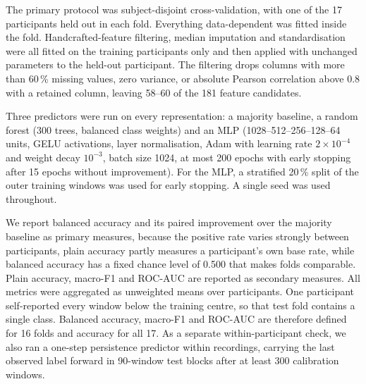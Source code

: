 The primary protocol was subject-disjoint cross-validation, with one of the 17 participants held out in each fold.
Everything data-dependent was fitted inside the fold.
Handcrafted-feature filtering, median imputation and standardisation were all fitted on the training participants only and then applied with unchanged parameters to the held-out participant.
The filtering drops columns with more than 60\,\% missing values, zero variance, or absolute Pearson correlation above 0.8 with a retained column, leaving 58--60 of the 181 feature candidates.

Three predictors were run on every representation: a majority baseline, a random forest (300 trees, balanced class weights) and an MLP (1028--512--256--128--64 units, GELU activations, layer normalisation, Adam with learning rate $2\times10^{-4}$ and weight decay $10^{-3}$, batch size 1024, at most 200 epochs with early stopping after 15 epochs without improvement).
For the MLP, a stratified 20\,\% split of the outer training windows was used for early stopping.
A single seed was used throughout.

We report balanced accuracy and its paired improvement over the majority baseline as primary measures, because the positive rate varies strongly between participants, plain accuracy partly measures a participant's own base rate, while balanced accuracy has a fixed chance level of 0.500 that makes folds comparable.
Plain accuracy, macro-F1 and ROC-AUC are reported as secondary measures.
All metrics were aggregated as unweighted means over participants.
One participant self-reported every window below the training centre, so that test fold contains a single class.
Balanced accuracy, macro-F1 and ROC-AUC are therefore defined for 16 folds and accuracy for all 17.
As a separate within-participant check, we also ran a one-step persistence predictor within recordings, carrying the last observed label forward in 90-window test blocks after at least 300 calibration windows.
